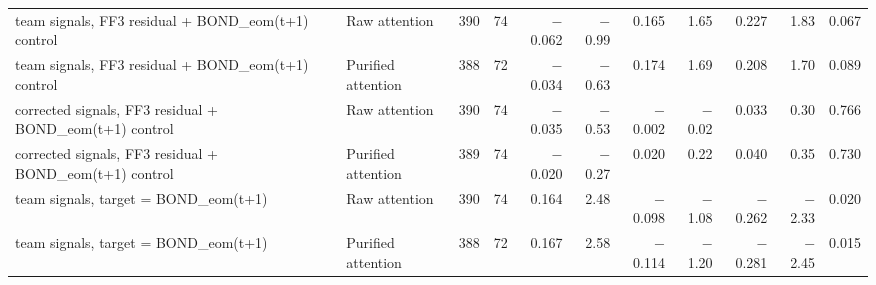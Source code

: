 \begin{tabular}{llrrrrrrrrr}
team signals, FF3 residual + BOND\_eom(t+1) control & Raw attention & 390 & 74 & $-$0.062 & $-$0.99 & 0.165 & 1.65 & 0.227 & 1.83 & 0.067 \\
team signals, FF3 residual + BOND\_eom(t+1) control & Purified attention & 388 & 72 & $-$0.034 & $-$0.63 & 0.174 & 1.69 & 0.208 & 1.70 & 0.089 \\
corrected signals, FF3 residual + BOND\_eom(t+1) control & Raw attention & 390 & 74 & $-$0.035 & $-$0.53 & $-$0.002 & $-$0.02 & 0.033 & 0.30 & 0.766 \\
corrected signals, FF3 residual + BOND\_eom(t+1) control & Purified attention & 389 & 74 & $-$0.020 & $-$0.27 & 0.020 & 0.22 & 0.040 & 0.35 & 0.730 \\
team signals, target = BOND\_eom(t+1) & Raw attention & 390 & 74 & 0.164 & 2.48 & $-$0.098 & $-$1.08 & $-$0.262 & $-$2.33 & 0.020 \\
team signals, target = BOND\_eom(t+1) & Purified attention & 388 & 72 & 0.167 & 2.58 & $-$0.114 & $-$1.20 & $-$0.281 & $-$2.45 & 0.015 \\
\bottomrule
\end{tabular}
